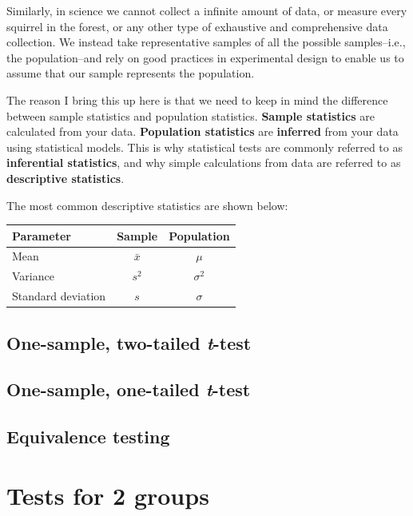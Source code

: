 \documentclass[
  13,
  letterpaper,
]{report}
\begin{document}
Similarly, in science we cannot collect a infinite amount of data, or
measure every squirrel in the forest, or any other type of exhaustive
and comprehensive data collection. We instead take representative
samples of all the possible samples--i.e., the population--and rely on
good practices in experimental design to enable us to assume that our
sample represents the population.

The reason I bring this up here is that we need to keep in mind the
difference between sample statistics and population statistics.
\textbf{Sample statistics} are calculated from your data.
\textbf{Population statistics} are \textbf{inferred} from your data
using statistical models. This is why statistical tests are commonly
referred to as \textbf{inferential statistics}, and why simple
calculations from data are referred to as \textbf{descriptive
statistics}.

The most common descriptive statistics are shown below:

\begin{longtable}[]{@{}lcc@{}}
\toprule\noalign{}
Parameter & Sample & Population \\
\midrule\noalign{}
\endhead
\bottomrule\noalign{}
\endlastfoot
Mean & \(\bar{x}\) & \(\mu\) \\
Variance & \(s^{2}\) & \(\sigma^{2}\) \\
Standard deviation & \(s\) & \(\sigma\) \\
\end{longtable}

\subsection{\texorpdfstring{One-sample, two-tailed
\emph{t}-test}{One-sample, two-tailed t-test}}\label{sec-groups-1samp-2t}

\subsection{\texorpdfstring{One-sample, one-tailed
\emph{t}-test}{One-sample, one-tailed t-test}}\label{sec-groups-1samp-1t}

\subsection{Equivalence testing}\label{sec-groups-1samp-tost}

\section{Tests for 2 groups}\label{sec-groups-2samp}
\end{document}

